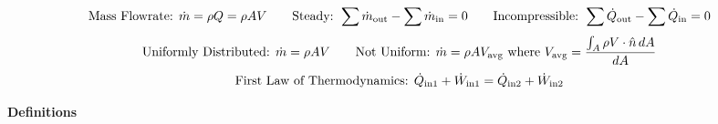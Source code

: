 \documentclass{article}
\begin{document}
\begin{center}
    \[\textnormal{Mass Flowrate: }\dot{m}=\rho Q=\rho AV\hspace{7mm}\textnormal{Steady: }\sum\dot{m}_{\textnormal{out}}-\sum\dot{m}_\textnormal{in}=0\hspace{7mm}\textnormal{Incompressible: }\sum\dot{Q}_{\textnormal{out}}-\sum\dot{Q}_\textnormal{in}=0\]
    \[\textnormal{Uniformly Distributed: }\dot{m}=\rho AV\hspace{7mm}\textnormal{Not Uniform: }\dot{m}=\rho AV_\textnormal{avg}\textnormal{ where }V_\textnormal{avg}=\frac{\int_{A}\rho V\cdot\hat{n}\,dA}{dA}\]
    \[\textnormal{First Law of Thermodynamics: }\dot{Q}_{\textnormal{in1}}+\dot{W}_{\textnormal{in1}}=\dot{Q}_{\textnormal{in2}}+\dot{W}_{\textnormal{in2}}\]
\end{center}
\newpage
{\large{\bf \noindent Definitions\\}}
\end{document}
